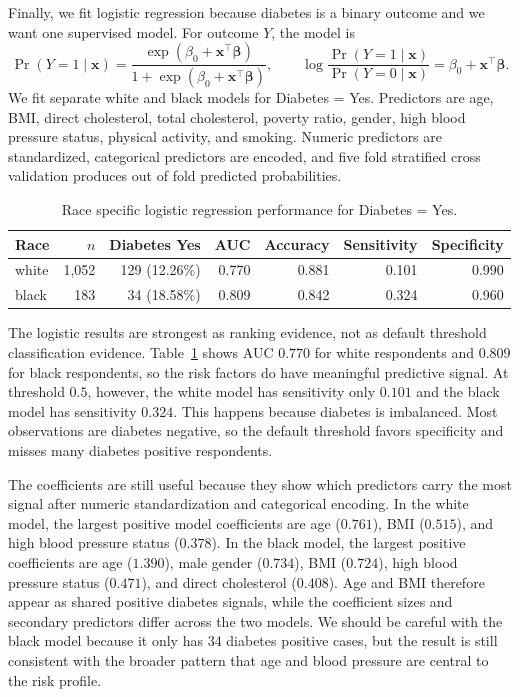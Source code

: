 \documentclass[10pt]{article}
\begin{document}
Finally, we fit logistic regression because diabetes is a binary outcome and we want one supervised model. For outcome $Y$, the model is
\[
  \Pr(Y=1\mid \bm{x})=
  \frac{\exp(\beta_0+\bm{x}^{\top}\bm{\beta})}
       {1+\exp(\beta_0+\bm{x}^{\top}\bm{\beta})},
  \qquad
  \log\frac{\Pr(Y=1\mid \bm{x})}{\Pr(Y=0\mid \bm{x})}
  =\beta_0+\bm{x}^{\top}\bm{\beta}.
\]
We fit separate white and black models for {Diabetes = Yes}. Predictors are age, BMI, direct cholesterol, total cholesterol, poverty ratio, gender, high blood pressure status, physical activity, and smoking. Numeric predictors are standardized, categorical predictors are encoded, and five fold stratified cross validation produces out of fold predicted probabilities.

\begin{table}[H]
\centering
\caption{Race specific logistic regression performance for {Diabetes = Yes}.}
\label{tab:logit}
\small
\begin{tabular}{lrrrrrr}
\toprule
Race & $n$ & Diabetes Yes & AUC & Accuracy & Sensitivity & Specificity \\
\midrule
white & 1,052 & 129 (12.26\%) & 0.770 & 0.881 & 0.101 & 0.990 \\
black & 183 & 34 (18.58\%) & 0.809 & 0.842 & 0.324 & 0.960 \\
\bottomrule
\end{tabular}
\end{table}

The logistic results are strongest as ranking evidence, not as default threshold classification evidence. Table~\ref{tab:logit} shows AUC $0.770$ for white respondents and $0.809$ for black respondents, so the risk factors do have meaningful predictive signal.
At threshold $0.5$, however, the white model has sensitivity only $0.101$ and the black model has sensitivity $0.324$. This happens because diabetes is imbalanced. Most observations are diabetes negative, so the default threshold favors specificity and misses many diabetes positive respondents.

The coefficients are still useful because they show which predictors carry the most signal after numeric standardization and categorical encoding. In the white model, the largest positive model coefficients are age ($0.761$), BMI ($0.515$), and high blood pressure status ($0.378$).
In the black model, the largest positive coefficients are age ($1.390$), male gender ($0.734$), BMI ($0.724$), high blood pressure status ($0.471$), and direct cholesterol ($0.408$). Age and BMI therefore appear as shared positive diabetes signals, while the coefficient sizes and secondary predictors differ across the two models. We should be careful with the black model because it only has 34 diabetes positive cases, but the result is still consistent with the broader pattern that age and blood pressure are central to the risk profile.
\end{document}

